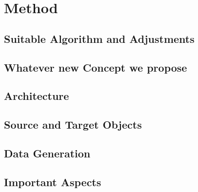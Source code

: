 \section{Method}
\subsection{Suitable Algorithm and Adjustments}
\subsection{Whatever new Concept we propose}
\subsection{Architecture}
\subsection{Source and Target Objects}
\subsection{Data Generation}
\subsection{Important Aspects}
